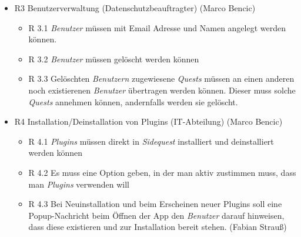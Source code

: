 \documentclass{article}
\begin{document}
\begin{itemize}
\item R3 Benutzerverwaltung (Datenschutzbeauftragter) (Marco Bencic)
    \begin{itemize}
        \item R 3.1 \textit{Benutzer} müssen mit Email Adresse und Namen angelegt werden können.
        \item R 3.2 \textit{Benutzer} müssen gelöscht werden können
        \item R 3.3 Gelöschten \textit{Benutzern} zugewiesene \textit{Quests} müssen an einen anderen noch existierenen \textit{Benutzer} übertragen werden können. Dieser muss solche \textit{Quests} annehmen können, andernfalls werden sie gelöscht. 
    \end{itemize}
\item R4 Installation/Deinstallation von Plugins (IT-Abteilung) (Marco Bencic)
    \begin{itemize}
        \item R 4.1 \textit{Plugins} müssen direkt in \textit{Sidequest} installiert und deinstalliert werden können 
        \item R 4.2 Es muss eine Option geben, in der man aktiv zustimmen muss, dass man \textit{Plugins} verwenden will
        \item R 4.3 Bei Neuinstallation und beim Erscheinen neuer Plugins soll eine Popup-Nachricht beim Öffnen der App den \textit{Benutzer} darauf hinweisen, dass diese existieren und zur Installation bereit stehen. (Fabian Strauß)
    \end{itemize}


\end{itemize}
\end{document}
